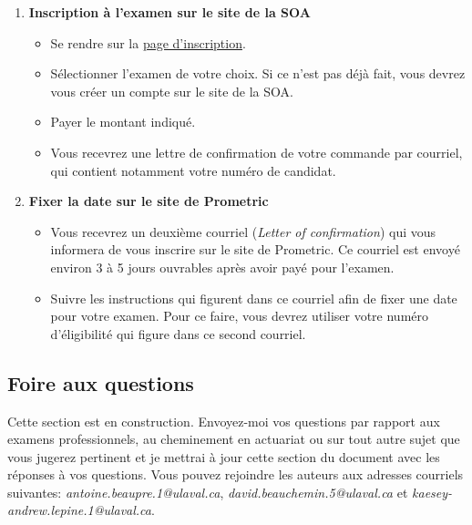 \begin{enumerate}
\item \textbf{Inscription à l'examen sur le site de la SOA}
\begin{itemize}
\item Se rendre sur la \href{https://www.soa.org/Education/Exam-Req/Registration/edu-registration.aspx}{page d'inscription}. 
\item Sélectionner l'examen de votre choix. Si ce n'est pas déjà fait, vous devrez vous créer un compte sur le site de la SOA.
\item Payer le montant indiqué.
\item Vous recevrez une lettre de confirmation de votre commande par courriel, qui contient notamment votre numéro de candidat.
\end{itemize}\vspace{\baselineskip}

\item \textbf{Fixer la date sur le site de Prometric}
\begin{itemize}
\item Vous recevrez un deuxième courriel (\textit{Letter of confirmation}) qui vous informera de vous inscrire sur le site de Prometric. Ce courriel est envoyé environ 3 à 5 jours ouvrables après avoir payé pour l'examen.
\item Suivre les instructions qui figurent dans ce courriel afin de fixer une date pour votre examen. Pour ce faire, vous devrez utiliser votre numéro d'éligibilité qui figure dans ce second courriel.
\end{itemize}
\end{enumerate}

\newpage
\subsection*{Foire aux questions}
\label{subsec:faq}
Cette section est en construction. Envoyez-moi vos questions par rapport aux examens professionnels, au cheminement en actuariat ou sur tout autre sujet que vous jugerez pertinent et je mettrai à jour cette section du document avec les réponses à vos questions. Vous pouvez rejoindre les auteurs aux adresses courriels suivantes: \emph{antoine.beaupre.1@ulaval.ca}, \emph{david.beauchemin.5@ulaval.ca} et \emph{kaesey-andrew.lepine.1@ulaval.ca}.
